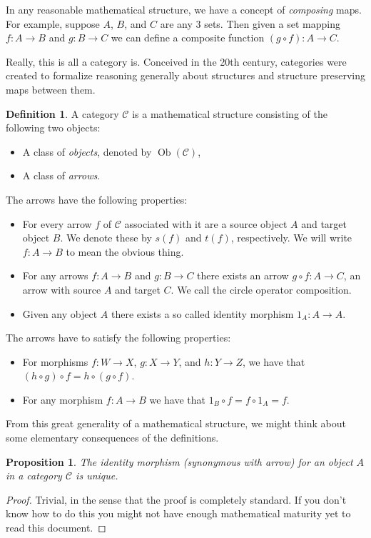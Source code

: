\documentclass[12pt]{article}
\theoremstyle{plain}
\newtheorem{proposition}{Proposition}
\theoremstyle{definition}
\newtheorem{definition}{Definition}
\newcommand{\Cc}{\mathcal{C}}
\newcommand{\Ob}{\operatorname{Ob}}
\begin{document}
In any reasonable mathematical structure, we have a concept of \textit{composing} maps. For example, suppose $A$, $B$, and $C$ are any $3$ sets. Then given a set mapping $f:A \to B$ and $g:B \to C$ we can define a composite function $(g \circ f): A \to C$. 

Really, this is all a category is. Conceived in the 20th century, categories were created to formalize reasoning generally about structures and structure preserving maps between them.

\begin{definition}
A category $\Cc$ is a mathematical structure consisting of the following two objects:
\begin{itemize}
	\item A class of \textit{objects}, denoted by $\Ob(\Cc)$,
	\item A class of \textit{arrows}.
\end{itemize}

The arrows have the following properties:
\begin{itemize}
	\item For every arrow $f$ of $\Cc$ associated with it are a source object $A$ and target object $B$. We denote these by $s(f)$ and $t(f)$, respectively. We will write $f:A \to B$ to mean the obvious thing.
	\item For any arrows $f:A \to B$ and $g: B \to C$ there exists an arrow $g \circ f: A \to C$, an arrow with source $A$ and target $C$. We call the circle operator composition.
	\item Given any object $A$ there exists a so called identity morphism $1_A: A \to A$.
\end{itemize}

The arrows have to satisfy the following properties:
\begin{itemize}
	\item For morphisms $f:W \to X$, $g: X \to Y$, and $h: Y \to Z$, we have that $(h \circ g) \circ f = h \circ (g \circ f)$.
	\item For any morphism $f: A \to B$ we have that $1_B \circ f = f \circ 1_A = f$.
\end{itemize}
\end{definition}

From this great generality of a mathematical structure, we might think about some elementary consequences of the definitions.
\begin{proposition}
	The identity morphism (synonymous with arrow) for an object $A$ in a category $\Cc$ is unique.
\end{proposition}
\begin{proof}
Trivial, in the sense that the proof is completely standard. If you don't know how to do this you might not have enough mathematical maturity yet to read this document.
\end{proof}
\end{document}

